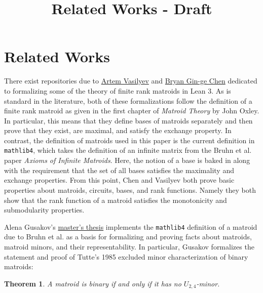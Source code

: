 \documentclass[sigplan,10pt,anonymous,review]{acmart}\settopmatter{printfolios=true,printccs=false,printacmref=false}\usepackage{graphicx} %
\title{Related Works - Draft}
\newtheorem{theorem}{Theorem}[section]
\begin{document}
\maketitle


\section{Related Works}
There exist repositories due to \href{https://github.com/VArtem/lean-matroids}{Artem Vasilyev} and \href{https://github.com/bryangingechen/lean-matroids}{Bryan Gin-ge Chen} 
dedicated to formalizing some of the theory of finite rank matroids in Lean 3. As is standard in the literature, both of these formalizations follow the definition of a 
finite rank matroid as given in the first chapter of \textit{Matroid Theory} by John Oxley. %
In particular, this means that they define bases of matroids separately and then prove that they exist, are maximal, and satisfy the exchange property. 
In contrast, the definition of matroids used in this paper is the current definition in \texttt{mathlib4}, which takes the definition of an infinite matrix from the
Bruhn et al. paper \textit{Axioms of Infinite Matroids}. Here, the notion of a base is baked in along with the requirement that the set of all bases satisfies the 
maximality and exchange properties. From this point, Chen and Vasilyev both prove basic properties about matroids, circuits, bases, and rank functions. 
Namely they both show that the rank function of a matroid satisfies the monotonicity and submodularity properties.

Alena Gusakov's \href{https://dspacemainprd01.lib.uwaterloo.ca/server/api/core/bitstreams/fe5957ef-3e10-4493-b11d-8d8121cafeba/content}{master's thesis} 
implements the \texttt{mathlib4} definition of a matroid due to Bruhn et al. as a basis for formalizing and proving facts about matroids, 
matroid minors, and their representability. In particular, Gusakov formalizes the statement and proof of Tutte's 1985 excluded minor characterization of binary matroids:
\begin{theorem}
    A matroid is binary if and only if it has no $U_{2,4}$-minor.
\end{theorem}
\end{document}
